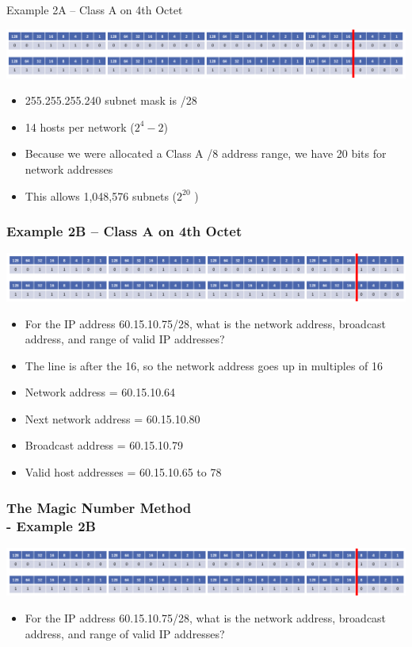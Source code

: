 \documentclass[pdflatex,compress]{beamer}
\begin{document}
\begin{frame}{Example 2A – Class A on 4th Octet}
	\begin{center}
		\includegraphics[width=\linewidth]{img/img20}
	\end{center}
	\begin{itemize}
		\item 255.255.255.240 subnet mask is /28
		\item 14 hosts per network ($ 2^4 - 2 $)
		\item Because we were allocated a Class A /8 address range, we have 20 bits for network addresses
		\item This allows 1,048,576 subnets ($ 2^{20} $ )
	\end{itemize}
\end{frame}

\begin{frame}
	\frametitle{Example 2B – Class A on 4th Octet}
	\begin{center}
		\includegraphics[width=\linewidth]{img/img21}
	\end{center}
	\begin{itemize}
		\item<1-> For the IP address 60.15.10.75/28, what is the network address, broadcast address, and range of valid IP addresses?
		\item<2-> The line is after the 16, so the network address goes up in multiples of 16
		\item<2-> Network address = 60.15.10.64
		\item<2-> Next network address = 60.15.10.80
		\item<2-> Broadcast address = 60.15.10.79
		\item<2-> Valid host addresses = 60.15.10.65 to 78
	\end{itemize}
\end{frame}

\begin{frame}
	\frametitle{The Magic Number Method\\ - Example 2B}
	\begin{center}
		\includegraphics[width=\linewidth]{img/img21}
	\end{center}
	\begin{itemize}
		\item For the IP address 60.15.10.75/28, what is the network address, broadcast address, and range of valid IP addresses?
	\end{itemize}
\end{frame}
\end{document}
